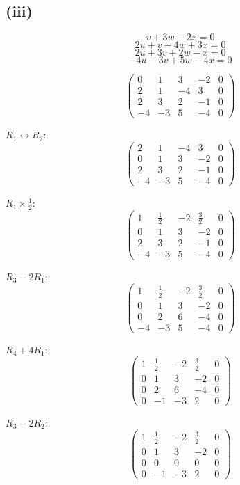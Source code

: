 \subsection*{(iii)}
\[
	v + 3w - 2x = 0
\]
\[
	2u + v - 4w + 3x = 0
\]
\[
	2u + 3v + 2w - x = 0
\]
\[
	-4u - 3v + 5w - 4x = 0
\]

\[
	\begin{pmatrix}
		0  & 1  & 3  & -2 & 0 \\
		2  & 1  & -4 & 3  & 0 \\
		2  & 3  & 2  & -1 & 0 \\
		-4 & -3 & 5  & -4 & 0
	\end{pmatrix}
\]

$R_1 \leftrightarrow R_2$:
\[
	\begin{pmatrix}
		2  & 1  & -4 & 3  & 0 \\
		0  & 1  & 3  & -2 & 0 \\
		2  & 3  & 2  & -1 & 0 \\
		-4 & -3 & 5  & -4 & 0
	\end{pmatrix}
\]

$R_1 \times \frac{1}{2}$:
\[
	\begin{pmatrix}
		1  & \frac{1}{2} & -2 & \frac{3}{2} & 0 \\
		0  & 1           & 3  & -2          & 0 \\
		2  & 3           & 2  & -1          & 0 \\
		-4 & -3          & 5  & -4          & 0
	\end{pmatrix}
\]

$R_3 - 2R_1$:
\[
	\begin{pmatrix}
		1 & \frac{1}{2} & -2 & \frac{3}{2} & 0 \\
		0 & 1           & 3  & -2          & 0 \\
		0 & 2           & 6  & -4          & 0 \\
		-4 & -3          & 5  & -4          & 0
	\end{pmatrix}
\]

$R_4 + 4R_1$:
\[
	\begin{pmatrix}
		1 & \frac{1}{2} & -2 & \frac{3}{2} & 0 \\
		0 & 1           & 3  & -2          & 0 \\
		0 & 2           & 6  & -4          & 0 \\
		0 & -1          & -3 & 2           & 0
	\end{pmatrix}
\]

$R_3 - 2R_2$:
\[
	\begin{pmatrix}
		1 & \frac{1}{2} & -2 & \frac{3}{2} & 0 \\
		0 & 1           & 3  & -2          & 0 \\
		0 & 0           & 0  & 0           & 0 \\
		0 & -1          & -3 & 2           & 0
	\end{pmatrix}
\]

